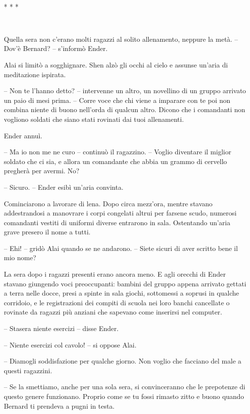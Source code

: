 {~}

\begin{center}
	{* * *}
\end{center}

{~}

{Quella sera non c'erano molti ragazzi al solito allenamento, neppure la
	metà. -- Dov'è Bernard? -- s'informò Ender.}

{Alai si limitò a sogghignare. Shen alzò gli occhi al cielo e assunse
	un'aria di meditazione ispirata.}

{-- Non te l'hanno detto? -- intervenne un altro, un novellino di un
	gruppo arrivato un paio di mesi prima. -- Corre voce che chi viene a
	imparare con te poi non combina niente di buono nell'orda di qualcun
	altro. Dicono che i comandanti non vogliono soldati che siano stati
	rovinati dai tuoi allenamenti.}

{Ender annuì.}

{-- Ma io non me ne curo -- continuò il ragazzino. -- Voglio diventare
	il miglior soldato che ci sia, e allora un comandante che abbia un
	grammo di cervello pregherà per avermi. No?}

{-- Sicuro. -- Ender esibì un'aria convinta.}

{Cominciarono a lavorare di lena. Dopo circa mezz'ora, mentre stavano
	addestrandosi a manovrare i corpi congelati altrui per farsene scudo,
	numerosi comandanti vestiti di uniformi diverse entrarono in sala.
	Ostentando un'aria grave presero il nome a tutti.}

{-- Ehi! -- gridò Alai quando se ne andarono. -- Siete sicuri di aver
	scritto bene il mio nome?}

{La sera dopo i ragazzi presenti erano ancora meno. E agli orecchi di
	Ender stavano giungendo voci preoccupanti: bambini del gruppo appena
	arrivato gettati a terra nelle docce, presi a spinte in sala giochi,
	sottomessi a soprusi in qualche corridoio, e le registrazioni dei
	compiti di scuola nei loro banchi cancellate o rovinate da ragazzi più
	anziani che sapevano come inserirsi nel computer.}

{-- Stasera niente esercizi -- disse Ender.}

{-- Niente esercizi col cavolo! -- si oppose Alai.}

{-- Diamogli soddisfazione per qualche giorno. Non voglio che facciano
	del male a questi ragazzini.}

{-- Se la smettiamo, anche per una sola sera, si convinceranno che le
	prepotenze di questo genere funzionano. Proprio come se tu fossi rimasto
	zitto e buono quando Bernard ti prendeva a pugni in testa.}

